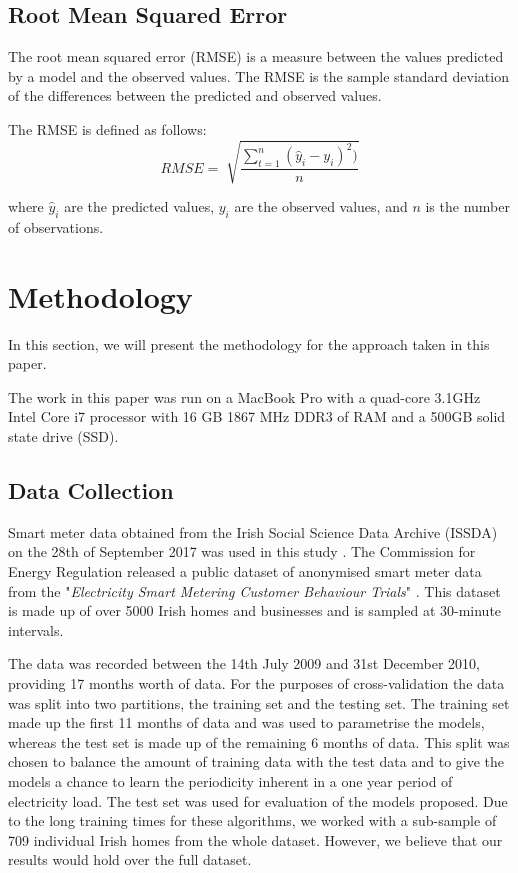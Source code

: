 \subsection{Root Mean Squared Error}

The root mean squared error (RMSE) is a measure between the values predicted by a model and the observed values. The RMSE is the sample standard deviation of the differences between the predicted and observed values.

The RMSE is defined as follows:
\begin{equation}
RMSE = \sqrt[]{\frac{\sum_{t=1}^n(\hat{y}_i-y_i)^2)}{n}}
\end{equation}

\noindent where $\hat{y}_i$ are the predicted values, $y_i$ are the observed values, and $n$ is the number of observations.


\section{Methodology}

In this section, we will present the methodology for the approach taken in this paper. 

The work in this paper was run on a MacBook Pro with a quad-core 3.1GHz Intel Core i7 processor with 16 GB 1867 MHz DDR3 of RAM and a 500GB solid state drive (SSD).

\subsection{Data Collection}


Smart meter data obtained from the Irish Social Science Data Archive (ISSDA) on the 28th of September 2017 was used in this study \cite{cer_2012}. The Commission for Energy Regulation released a public dataset of anonymised smart meter data from the "\textit{Electricity Smart Metering Customer Behaviour Trials}" \cite{setis}. This dataset is made up of over 5000 Irish homes and businesses and is sampled at 30-minute intervals.

The data was recorded between the 14th July 2009 and 31st December 2010, providing 17 months worth of data. For the purposes of cross-validation the data was split into two partitions, the training set and the testing set. The training set made up the first 11 months of data and was used to parametrise the models, whereas the test set is made up of the remaining 6 months of data. This split was chosen to balance the amount of training data with the test data and to give the models a chance to learn the periodicity inherent in a one year period of electricity load. The test set was used for evaluation of the models proposed. Due to the long training times for these algorithms, we worked with a sub-sample of 709 individual Irish homes from the whole dataset. However, we believe that our results would hold over the full dataset.

